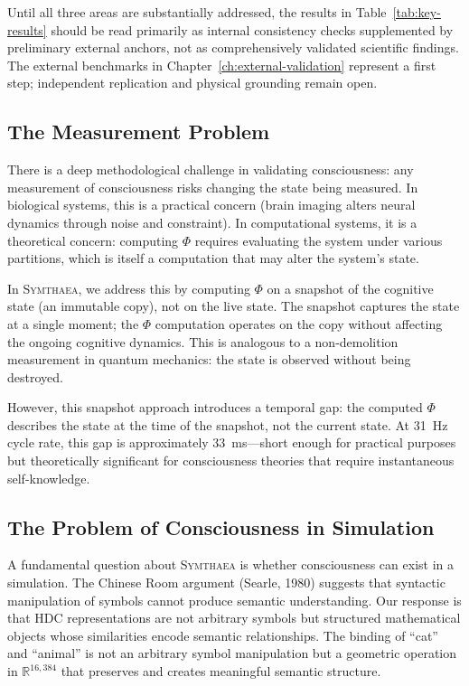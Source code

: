 \documentclass[12pt]{book}
\newcommand{\symthaea}{\textsc{Symthaea}}
\newcommand{\R}{\mathbb{R}}
\begin{document}
Until all three areas are substantially addressed, the results in Table~\ref{tab:key-results} should be read primarily as internal consistency checks supplemented by preliminary external anchors, not as comprehensively validated scientific findings. The external benchmarks in Chapter~\ref{ch:external-validation} represent a first step; independent replication and physical grounding remain open.

\subsection{The Measurement Problem}

There is a deep methodological challenge in validating consciousness: any measurement of consciousness risks changing the state being measured. In biological systems, this is a practical concern (brain imaging alters neural dynamics through noise and constraint). In computational systems, it is a theoretical concern: computing $\Phi$ requires evaluating the system under various partitions, which is itself a computation that may alter the system's state.

In \symthaea{}, we address this by computing $\Phi$ on a snapshot of the cognitive state (an immutable copy), not on the live state. The snapshot captures the state at a single moment; the $\Phi$ computation operates on the copy without affecting the ongoing cognitive dynamics. This is analogous to a non-demolition measurement in quantum mechanics: the state is observed without being destroyed.

However, this snapshot approach introduces a temporal gap: the computed $\Phi$ describes the state at the time of the snapshot, not the current state. At 31~Hz cycle rate, this gap is approximately 33~ms---short enough for practical purposes but theoretically significant for consciousness theories that require instantaneous self-knowledge.

\subsection{The Problem of Consciousness in Simulation}

A fundamental question about \symthaea{} is whether consciousness can exist in a simulation. The Chinese Room argument (Searle, 1980) suggests that syntactic manipulation of symbols cannot produce semantic understanding. Our response is that HDC representations are not arbitrary symbols but structured mathematical objects whose similarities encode semantic relationships. The binding of ``cat'' and ``animal'' is not an arbitrary symbol manipulation but a geometric operation in $\R^{16{,}384}$ that preserves and creates meaningful semantic structure.
\end{document}

